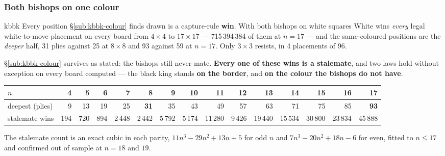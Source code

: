 \documentclass[10pt]{article}
\begin{document}
\subsubsection{Both bishops on one colour}\label{sub:kbbk-onecolour}

\begin{result}[title={The capture rule repeals the colour rule outright}]{kbbk}
Every position \S\ref{sub:kbbk-colour} finds drawn is a capture-rule
\textbf{win}. With both bishops on white squares White wins \emph{every} legal
white-to-move placement on every board from $4\times4$ to $17\times17$ ---
715\,394\,384 of them at $n=17$ --- and the same-coloured positions are the
\emph{deeper} half, 31 plies against 25 at $8\times8$ and 93 against 59 at
$n=17$. Only $3\times3$ resists, in 4 placements of 96.

\smallskip
\S\ref{sub:kbbk-colour} survives as stated: the bishops still never mate.
\textbf{Every one of these wins is a stalemate}, and two laws hold without
exception on every board computed --- the black king stands \textbf{on the
border}, and \textbf{on the colour the bishops do not have}.
\end{result}

\begin{center}\scriptsize
\setlength{\tabcolsep}{4pt}
\begin{tabular}{@{}lrrrrrrrrrrrrrr@{}}
\toprule
$n$ & 4 & 5 & 6 & 7 & 8 & 9 & 10 & 11 & 12 & 13 & 14 & 15 & 16 & 17\\
\midrule
deepest (plies) & 9 & 13 & 19 & 25 & \textbf{31} & 35 & 43 & 49 & 57 & 63 & 71 & 75 & 85 & \textbf{93}\\
stalemate wins & 194 & 720 & 894 & 2\,448 & 2\,442 & 5\,792 & 5\,174 & 11\,280 &
  9\,426 & 19\,440 & 15\,534 & 30\,800 & 23\,834 & 45\,888\\
\bottomrule
\end{tabular}
\end{center}

\noindent
The stalemate count is an exact cubic in each parity, $11n^3-29n^2+13n+5$ for
odd $n$ and $7n^3-20n^2+18n-6$ for even, fitted to $n\le17$ and confirmed out
of sample at $n=18$ and $19$.
\end{document}
